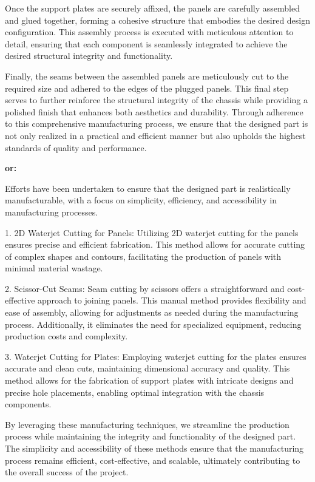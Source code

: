 Once the support plates are securely affixed, the panels are carefully assembled and glued together, forming a cohesive structure that embodies the desired design configuration. This assembly process is executed with meticulous attention to detail, ensuring that each component is seamlessly integrated to achieve the desired structural integrity and functionality.

Finally, the seams between the assembled panels are meticulously cut to the required size and adhered to the edges of the plugged panels. This final step serves to further reinforce the structural integrity of the chassis while providing a polished finish that enhances both aesthetics and durability. Through adherence to this comprehensive manufacturing process, we ensure that the designed part is not only realized in a practical and efficient manner but also upholds the highest standards of quality and performance.

\textbf{or:}

Efforts have been undertaken to ensure that the designed part is realistically manufacturable, with a focus on simplicity, efficiency, and accessibility in manufacturing processes.

1.	2D Waterjet Cutting for Panels: Utilizing 2D waterjet cutting for the panels ensures precise and efficient fabrication. This method allows for accurate cutting of complex shapes and contours, facilitating the production of panels with minimal material wastage.

2.	Scissor-Cut Seams: Seam cutting by scissors offers a straightforward and cost-effective approach to joining panels. This manual method provides flexibility and ease of assembly, allowing for adjustments as needed during the manufacturing process. Additionally, it eliminates the need for specialized equipment, reducing production costs and complexity.

3.	Waterjet Cutting for Plates: Employing waterjet cutting for the plates ensures accurate and clean cuts, maintaining dimensional accuracy and quality. This method allows for the fabrication of support plates with intricate designs and precise hole placements, enabling optimal integration with the chassis components.

By leveraging these manufacturing techniques, we streamline the production process while maintaining the integrity and functionality of the designed part. The simplicity and accessibility of these methods ensure that the manufacturing process remains efficient, cost-effective, and scalable, ultimately contributing to the overall success of the project.





